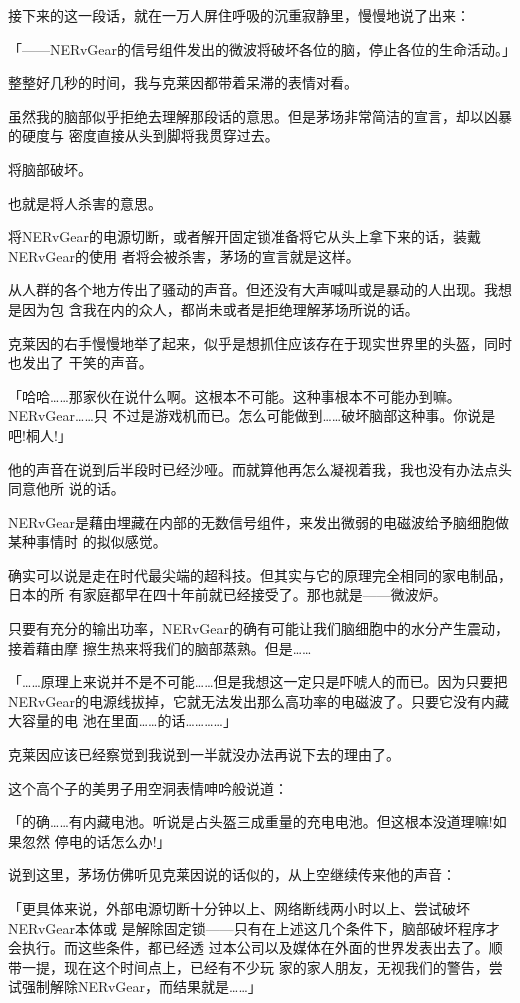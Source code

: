 \documentclass[11pt]{book}
\begin{document}
接下来的这一段话，就在一万人屏住呼吸的沉重寂静里，慢慢地说了出来：

「——NERvGear的信号组件发出的微波将破坏各位的脑，停止各位的生命活动。」

整整好几秒的时间，我与克莱因都带着呆滞的表情对看。

虽然我的脑部似乎拒绝去理解那段话的意思。但是茅场非常简洁的宣言，却以凶暴的硬度与
密度直接从头到脚将我贯穿过去。

将脑部破坏。

也就是将人杀害的意思。

将NERvGear的电源切断，或者解开固定锁准备将它从头上拿下来的话，装戴NERvGear的使用
者将会被杀害，茅场的宣言就是这样。

从人群的各个地方传出了骚动的声音。但还没有大声喊叫或是暴动的人出现。我想是因为包
含我在内的众人，都尚未或者是拒绝理解茅场所说的话。

克莱因的右手慢慢地举了起来，似乎是想抓住应该存在于现实世界里的头盔，同时也发出了
干笑的声音。

「哈哈……那家伙在说什么啊。这根本不可能。这种事根本不可能办到嘛。NERvGear……只
不过是游戏机而已。怎么可能做到……破坏脑部这种事。你说是吧!桐人!」

他的声音在说到后半段时已经沙哑。而就算他再怎么凝视着我，我也没有办法点头同意他所
说的话。

NERvGear是藉由埋藏在内部的无数信号组件，来发出微弱的电磁波给予脑细胞做某种事情时
的拟似感觉。

确实可以说是走在时代最尖端的超科技。但其实与它的原理完全相同的家电制品，日本的所
有家庭都早在四十年前就已经接受了。那也就是——微波炉。

只要有充分的输出功率，NERvGear的确有可能让我们脑细胞中的水分产生震动，接着藉由摩
擦生热来将我们的脑部蒸熟。但是……

「……原理上来说并不是不可能……但是我想这一定只是吓唬人的而已。因为只要把
NERvGear的电源线拔掉，它就无法发出那么高功率的电磁波了。只要它没有内藏大容量的电
池在里面……的话…………」

克莱因应该已经察觉到我说到一半就没办法再说下去的理由了。

这个高个子的美男子用空洞表情呻吟般说道：

「的确……有内藏电池。听说是占头盔三成重量的充电电池。但这根本没道理嘛!如果忽然
停电的话怎么办!」

说到这里，茅场仿佛听见克莱因说的话似的，从上空继续传来他的声音：

「更具体来说，外部电源切断十分钟以上、网络断线两小时以上、尝试破坏NERvGear本体或
是解除固定锁——只有在上述这几个条件下，脑部破坏程序才会执行。而这些条件，都已经透
过本公司以及媒体在外面的世界发表出去了。顺带一提，现在这个时间点上，已经有不少玩
家的家人朋友，无视我们的警告，尝试强制解除NERvGear，而结果就是……」
\end{document}
